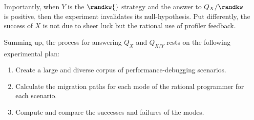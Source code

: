 Importantly, when $Y$ is the $\randkw{}$ strategy and the answer to
$Q_X/\randkw$ is positive, then the experiment invalidates its null-hypothesis.
Put differently, the success of $X$ is not due to sheer luck but the rational
use of profiler feedback.

Summing up, the process for answering $Q_X$ and $Q_{X/Y}$ rests on the following
experimental plan:
\begin{enumerate}

\item Create a large and diverse corpus of performance-debugging scenarios.

\item Calculate the migration paths for each mode of the rational programmer for
  each scenario.

\item Compute and compare the successes and failures of the modes.

\end{enumerate}


